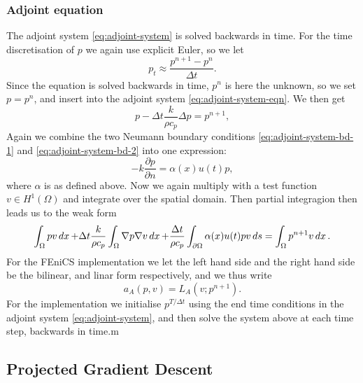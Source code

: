 \subsubsection{Adjoint equation}

The adjoint system \eqref{eq:adjoint-system} is solved backwards in time. For the time discretisation of $p$ we again use explicit Euler, so we let 
\begin{equation*}
 p_t \approx \frac{p^{n+1} - p^n}{\Delta t}.
\end{equation*}
Since the equation is solved backwards in time, $p^n$ is here the unknown, so we set $p=p^n$, and insert into the adjoint system \eqref{eq:adjoint-system-eqn}. We then get
\begin{equation*}
    p - \Delta t\frac{k}{\rho c_p}\Delta p =  p^{n+1}, 
\end{equation*}
Again we combine the two Neumann boundary conditions \eqref{eq:adjoint-system-bd-1} and \eqref{eq:adjoint-system-bd-2} into one expression:
\begin{equation*}
    -k\frac{\partial p}{\partial n} = \alpha(x)u(t)p,
\end{equation*}
where $\alpha$ is as defined above. Now we again multiply with a test function $v\in H^1(\Omega)$ and integrate over the spatial domain. Then partial integragion then leads us to the weak form
\begin{equation*}
    \int_\Omega pv\mathop{dx} + \Delta t\frac{k}{\rho c_p} \int_\Omega \nabla p \nabla v \mathop{dx} + \frac{\Delta t}{\rho c_p}\int_{\partial\Omega} \alpha(x)u(t)pv \mathop{ds}  = \int_\Omega p^{n+1}v\mathop{dx}.
\end{equation*}
For the FEniCS implementation we let the left hand side and the right hand side be the bilinear, and linar form respectively, and we thus write
\begin{equation*}
    a_A(p, v) = L_A(v; p^{n+1}).
\end{equation*}
For the implementation we initialise $p^{T/\Delta t}$ using the end time conditions in the adjoint system \eqref{eq:adjoint-system}, and then solve the system above at each time step, backwards in time.m


\subsection{Projected Gradient Descent}


